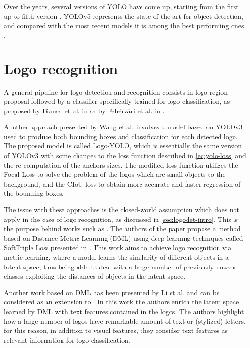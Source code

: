 Over the years, several versions of YOLO have come up, starting from the first up to fifth version \cite{redmon2016you, redmon2017yolo9000, redmon2018yolov3, bochkovskiy2020yolov4, glenn_jocher_2021_5563715}. YOLOv5 represents the state of the art for object detection, and compared with the most recent models it is among the best performing ones \cite{zaidi2022survey}.

\section{Logo recognition}
\label{sec:sota-logoyolo}

A general pipeline for logo detection and recognition consists in logo region proposal followed by a classifier specifically trained for logo classification, as proposed by Bianco et al. in \cite{bianco2017deep} or by Fehérvári et al. in \cite{fehervari2019scalable}.

Another approach presented by Wang et al. \cite{wang2022logodet} involves a model based on YOLOv3 \cite{redmon2018yolov3} used to produce both bounding boxes and classification for each detected logo. The proposed model is called Logo-YOLO, which is essentially the same version of YOLOv3 with some changes to the loss function described in \autoref{eq:yolo-loss} and the re-computation of the anchors sizes. The modified loss function utilizes the Focal Loss \cite{lin2017focal} to solve the problem of the logos which are small objects to the background, and the  CIoU loss \cite{zheng2020distance} to obtain more accurate and faster regression of the bounding boxes.

The issue with these approaches is the closed-world assumption which does not apply in the case of logo recognition, as discussed in \autoref{sec:logodet-intro}. This is the purpose behind works such as \cite{fehervari2019scalable}. The authors of the paper propose a method based on Distance Metric Learning (DML) using deep learning techniques called SoftTriple Loss presented in \cite{qian2019softtriple}. This work aims to achieve logo recognition via metric learning, where a model learns the similarity of different objects in a latent space, thus being able to deal with a large number of previously unseen classes exploiting the distances of objects in the latent space.

Another work based on DML has been presented by Li et al. \cite{li2022seetek} and can be considered as an extension to \cite{fehervari2019scalable}. In this work the authors enrich the latent space learned by DML with text features contained in the logos. The authors highlight how a large number of logos have remarkable amount of text or (stylized) letters, for this reason, in addition to visual features, they consider text features as relevant information for logo classification.

